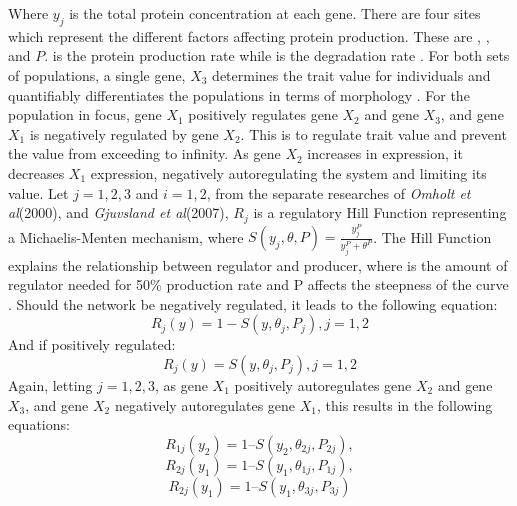Where $y_j$ is the total protein concentration at each gene. There are four sites which represent the different factors affecting protein production. These are \textit{\textalpha}, \textit{\textgamma}, \textit{\texttheta} and $P$. \textit{\textalpha} is the protein production rate while \textit{\textgamma} is the degradation rate \cite{omholt2000gene}. For both sets of populations, a single gene, $X_3$ determines the trait value for individuals and quantifiably differentiates the populations in terms of morphology \cite{orr2001genetics}. For the population in focus, gene $X_1$ positively regulates gene $X_2$ and gene $X_3$, and gene $X_1$ is negatively regulated by gene $X_2$. This is to regulate trait value and prevent the value from exceeding to infinity. As gene $X_2$ increases in expression, it decreases $X_1$ expression, negatively autoregulating the system and limiting its value. Let $j = {1,2,3}$ and $i = {1,2}$, from the separate researches of \textit{Omholt et al}(2000), and \textit{Gjuvsland et al}(2007), $R_{j}$ is a regulatory Hill Function representing a Michaelis-Menten mechanism, where $S(y_j,\theta,P) = \frac{y_j^P}{y_j^P+\theta^P}$. The Hill Function explains the relationship between regulator and producer, where \texttheta is the amount of regulator needed for 50\% production rate and P affects the steepness of the curve \cite{gjuvsland2007statistical,omholt2000gene}. Should the network be negatively regulated, it leads to the following equation:
\begin{equation*}
    R_{j}(y) = 1 - S(y, \theta_j , P_j), j = {1, 2} \label{eq:Negative autoregulation function} \tag{2}
\end{equation*}
And if positively regulated:
\begin{equation*}
	R_{j}(y) = S(y, \theta_j, P_j), j = {1, 2} \label{eq:Positive autoregulation function} \tag{3}
\end{equation*}
Again, letting $j = {1,2,3}$, as gene $X_1$ positively autoregulates gene $X_2$ and gene $X_3$, and gene $X_2$ negatively autoregulates gene $X_1$, this results in the following equations:
\begin{equation*}
    R_{1j}(y_2) = 1 – S(y_2, \theta_{2j}, P_{2j}) \label{eq:X1 negative autoregulation function} \tag{4.1},
\end{equation*}
\begin{equation*}
    R_{2j}(y_1) = 1 – S(y_1, \theta_{1j}, P_{1j}) \label{eq:X2 positive autoregulation function} \tag{4.2},
\end{equation*}
\begin{equation*}
    R_{2j}(y_1) = 1 – S(y_1, \theta_{3j}, P_{3j}) \label{eq:X3 positive autoregulation function} \tag{4.3}
\end{equation*}
